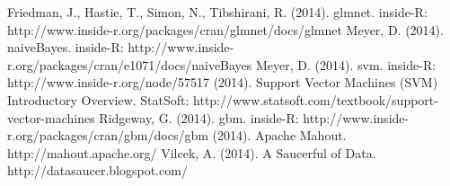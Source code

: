 \documentclass[twoside]{article}
\begin{document}
\begin{multicols}{2}
\begin{thebibliography}{99}
 Friedman, J., Hastie, T., Simon, N., Tibshirani, R. (2014). glmnet. inside-R: http://www.inside-r.org/packages/cran/glmnet/docs/glmnet
 Meyer, D. (2014). naiveBayes. inside-R: http://www.inside-r.org/packages/cran/e1071/docs/naiveBayes
 Meyer, D. (2014). svm. inside-R: http://www.inside-r.org/node/57517
 (2014). Support Vector Machines (SVM) Introductory Overview. StatSoft: http://www.statsoft.com/textbook/support-vector-machines
 Ridgeway, G. (2014). gbm. inside-R: http://www.inside-r.org/packages/cran/gbm/docs/gbm
 (2014). Apache Mahout. http://mahout.apache.org/
 Vilcek, A. (2014). A Saucerful of Data. http://datasaucer.blogspot.com/
\end{thebibliography}


\end{multicols}
\end{document}
